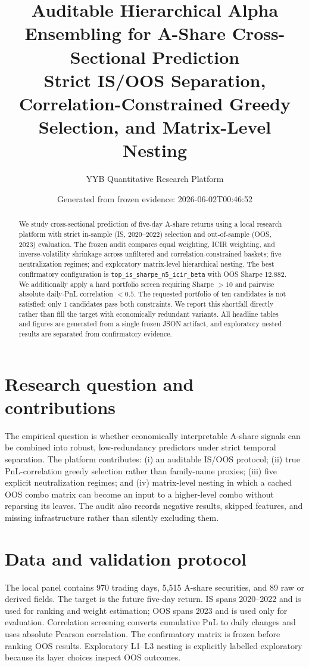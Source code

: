 \documentclass[10pt,a4paper]{article}
\title{Auditable Hierarchical Alpha Ensembling for A-Share Cross-Sectional Prediction\\
\large Strict IS/OOS Separation, Correlation-Constrained Greedy Selection, and Matrix-Level Nesting}
\author{YYB Quantitative Research Platform}
\date{Generated from frozen evidence: 2026-06-02T00:46:52}
\begin{document}
\maketitle

\begin{abstract}
We study cross-sectional prediction of five-day A-share returns using a local research platform with strict
in-sample (IS, 2020--2022) selection and out-of-sample (OOS, 2023) evaluation. The frozen audit compares
equal weighting, ICIR weighting, and inverse-volatility shrinkage across unfiltered and correlation-constrained
baskets; five neutralization regimes; and exploratory matrix-level hierarchical nesting. The best confirmatory
configuration is \texttt{top\_is\_sharpe\_n5\_icir\_beta} with OOS Sharpe 12.882.
We additionally apply a hard portfolio screen requiring Sharpe $>10$ and pairwise absolute daily-PnL
correlation $<0.5$. The requested portfolio of ten candidates is not satisfied: only 1 candidates pass both constraints. We report this shortfall directly rather than fill the target with
economically redundant variants. All headline tables and figures are generated from a single frozen JSON
artifact, and exploratory nested results are separated from confirmatory evidence.
\end{abstract}

\section{Research question and contributions}
The empirical question is whether economically interpretable A-share signals can be combined into robust,
low-redundancy predictors under strict temporal separation. The platform contributes: (i) an auditable IS/OOS
protocol; (ii) true PnL-correlation greedy selection rather than family-name proxies; (iii) five explicit
neutralization regimes; and (iv) matrix-level nesting in which a cached OOS combo matrix can become an input to
a higher-level combo without reparsing its leaves. The audit also records negative results, skipped features,
and missing infrastructure rather than silently excluding them.

\section{Data and validation protocol}
The local panel contains 970 trading days, 5,515 A-share securities, and 89 raw or derived fields. The target is
the future five-day return. IS spans 2020--2022 and is used for ranking and weight estimation; OOS spans 2023
and is used only for evaluation. Correlation screening converts cumulative PnL to daily changes and uses
absolute Pearson correlation. The confirmatory matrix is frozen before ranking OOS results. Exploratory L1--L3
nesting is explicitly labelled exploratory because its layer choices inspect OOS outcomes.
\end{document}
